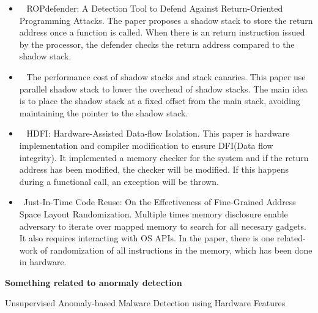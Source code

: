 \documentclass[]{article}
\begin{document}
\begin{itemize}
	\item ~\cite{davi2011ropdefender} ROPdefender: A Detection Tool to Defend
Against Return-Oriented Programming Attacks. The paper proposes a shadow stack
to store the return address once a function is called. When there is an return
instruction issued by the processor, the defender checks the return address
compared to the shadow stack.
	\item ~\cite{dang2015performance} The performance cost of shadow stacks and
stack canaries. This paper use parallel shadow stack to lower the overhead of
shadow stacks. The main idea is to place the shadow stack at a fixed offset from
the main stack, avoiding maintaining the pointer to the shadow stack.
	\item ~\cite{songhdfi} HDFI: Hardware-Assisted Data-flow Isolation. This
paper is hardware implementation and compiler modification to ensure DFI(Data
flow integrity). It implemented a memory checker for the system and if the
return address has been modified, the checker will be modified. If this happens
during a functional call, an exception will be thrown.
	\item ~\cite{snow2013just}Just-In-Time Code Reuse: On the Effectiveness of
Fine-Grained Address Space Layout Randomization. Multiple times memory
disclosure enable adversary to iterate over mapped memory to search for all
necesary gadgets. It also requires interacting with OS APIs. In the paper, there
is one related-work of randomization of all instructions in the memory, which
has been done in hardware.
\end{itemize}
\textbf{Something related to anormaly detection}
\item Unsupervised Anomaly-based Malware Detection using Hardware Features

{}

\end{document}
